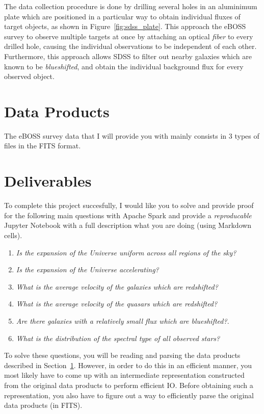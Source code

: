 The data collection procedure is done by drilling several holes in an aluminimum plate which are positioned in a particular way to obtain individual fluxes of target objects, as shown in Figure~\ref{fig:sdss_plate}. This approach the eBOSS survey to observe multiple targets at once by attaching an optical \emph{fiber} to every drilled hole, causing the individual observations to be independent of each other. Furthermore, this approach allows SDSS to filter out nearby galaxies which are known to be \emph{blueshifted}, and obtain the individual background flux for every observed object.

\newpage
\section{Data Products}
\label{sec:data_products}

The eBOSS survey data that I will provide you with mainly consists in 3 types of files in the FITS format.

\section{Deliverables}
\label{sec:deliverables}

To complete this project succesfully, I would like you to solve and provide proof for the following main questions with Apache Spark and provide a \emph{reproducable} Jupyter Notebook with a full description what you are doing (using Markdown cells).

\begin{enumerate}
  \item \emph{Is the expansion of the Universe uniform across all regions of the sky?}
  \item \emph{Is the expansion of the Universe accelerating?}
  \item \emph{What is the average velocity of the galaxies which are redshifted?}
  \item \emph{What is the average velocity of the quasars which are redshifted?}
  \item \emph{Are there galaxies with a relatively small flux which are blueshifted?}.
  \item \emph{What is the distribution of the spectral type of all observed stars?}
\end{enumerate}

To solve these questions, you will be reading and parsing the data products described in Section~\ref{sec:data_products}. However, in order to do this in an efficient manner, you most likely have to come up with an intermediate representation constructed from the original data products to perform efficient IO. Before obtaining such a representation, you also have to figure out a way to efficiently parse the original data products (in FITS).\\

